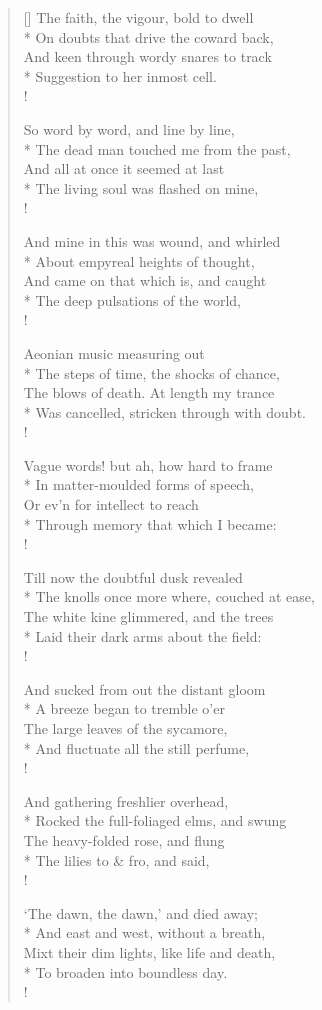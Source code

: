 \documentclass[MAIN]{subfiles}
\begin{document}
\begin{verse}[\versewidth]
The faith, the vigour, bold to dwell\\*
On doubts that drive the coward back,\\
And keen through wordy snares to track\\*
Suggestion to her inmost cell.\\!

So word by word, and line by line,\\*
The dead man touched me from the past,\\ 
And all at once it seemed at last\\* 
The living soul was flashed on mine,\\!

And mine in this was wound, and whirled\\*
About empyreal heights of thought,\\
And came on that which is, and caught\\* 
The deep pulsations of the world,\\!

Aeonian music measuring out\\*
The steps of time, the shocks of chance,\\
The blows of death. At length my trance\\*
Was cancelled, stricken through with doubt.\\!

Vague words! but ah, how hard to frame\\*
In matter-moulded forms of speech,\\
Or ev'n for intellect to reach\\*
Through memory that which I became:\\!

Till now the doubtful dusk revealed\\*
The knolls once more where, couched at ease,\\ 
The white kine glimmered, and the trees\\*
Laid their dark arms about the field:\\!

And sucked from out the distant gloom\\*
A breeze began to tremble o'er\\
The large leaves of the sycamore,\\*
And fluctuate all the still perfume,\\!

And gathering freshlier overhead,\\*
Rocked the full-foliaged elms, and swung\\
The heavy-folded rose, and flung\\*
The lilies to \& fro, and said,\\!

`The dawn, the dawn,' and died away;\\* 
And east and west, without a breath,\\
Mixt their dim lights, like life and death,\\*
To broaden into boundless day.\\!
\end{verse}
\end{document}
